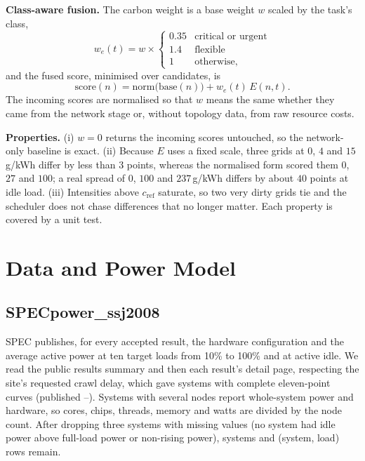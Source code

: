 \documentclass[conference]{IEEEtran}
\begin{document}
\textbf{Class-aware fusion.} The carbon weight is a base weight $w$ scaled by the task's class,
\begin{equation}
w_e(t)=w\times\begin{cases}0.35 & \text{critical or urgent}\\ 1.4 & \text{flexible}\\ 1 & \text{otherwise,}\end{cases}
\label{eq:weight}
\end{equation}
and the fused score, minimised over candidates, is
\begin{equation}
\mathrm{score}(n)=\mathrm{norm}\big(\mathrm{base}(n)\big)+w_e(t)\,E(n,t).
\label{eq:fused}
\end{equation}
The incoming scores are normalised so that $w$ means the same whether they came from the network stage or, without topology data, from raw resource costs.

\textbf{Properties.} (i) $w=0$ returns the incoming scores untouched, so the network-only baseline is exact. (ii) Because $E$ uses a fixed scale, three grids at $0$, $4$ and $15$\,g/kWh differ by less than $3$ points, whereas the normalised form scored them $0$, $27$ and $100$; a real spread of $0$, $100$ and $237$\,g/kWh differs by about $40$ points at idle load. (iii) Intensities above $c_{\mathrm{ref}}$ saturate, so two very dirty grids tie and the scheduler does not chase differences that no longer matter. Each property is covered by a unit test.

\section{Data and Power Model}
\label{sec:data}
\subsection{SPECpower\_ssj2008}
SPEC publishes, for every accepted result, the hardware configuration and the average active power at ten target loads from 10\% to 100\% and at active idle. We read the public results summary and then each result's detail page, respecting the site's requested crawl delay, which gave \NSystemsScraped{} systems with complete eleven-point curves (published \YearLo--\YearHi). Systems with several nodes report whole-system power and hardware, so cores, chips, threads, memory and watts are divided by the node count. After dropping three systems with missing values (no system had idle power above full-load power or non-rising power), \NSystemsKept{} systems and \NRowsKept{} (system, load) rows remain.
\end{document}
